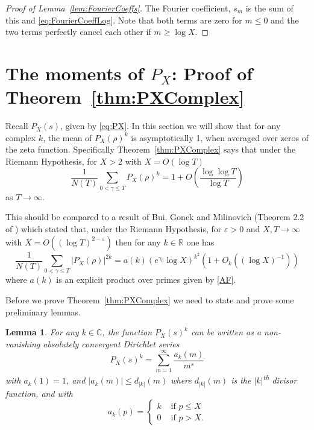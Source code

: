 \documentclass[12pt,a4paper,reqno]{amsart}
\newtheorem{lemma}[theorem]{Lemma}
\theoremstyle{remark}
\numberwithin{equation}{section}
\newcommand{\RR}{\mathbb{R}}
\newcommand{\CC}{\mathbb{C}}
\begin{document}
\begin{proof}[Proof of Lemma~\ref{lem:FourierCoeffs}]
The Fourier coefficient, $s_m$ is the sum of this and \eqref{eq:FourierCoeffLog}. Note that both terms are zero for $m\leq 0$ and the two terms perfectly cancel each other if $m\geq \log X$.
\end{proof}


\section{The moments of $P_X$: Proof of Theorem~\ref{thm:PXComplex}}\label{sect:PX}

Recall $P_X(s)$, given by \eqref{eq:PX}. In this section we will show that for any complex $k$, the mean of $P_X(\rho)^k$ is asymptotically 1, when averaged over zeros of the zeta function. Specifically Theorem~\ref{thm:PXComplex} says that under the Riemann Hypothesis, for $X>2$ with $X=O(\log T)$
\[
\frac{1}{N(T)} \sum_{0 < \gamma \leq T} P_X(\rho)^k = 1 + O\left(\frac{\log\log T}{\log T}\right)
\]
as $T\to\infty$.

This should be compared to a result of Bui, Gonek and Milinovich (Theorem 2.2 of \cite{BGM13}) which stated that, under the Riemann Hypothesis,
for $\varepsilon > 0$ and $X, T \to\infty$ with $X=O\left( (\log T)^{2-\varepsilon} \right)$ then for any $k\in\RR$ one has
\[
\frac{1}{N(T)} \sum_{0 < \gamma \leq T} \left\vert P_X(\rho)\right\vert^{2k} = a(k) \left(e^{\gamma_0} \log X\right)^{k^2} \left(1+O_k\left((\log X)^{-1} \right) \right)
\]
where $a(k)$ is an explicit product over primes given by \eqref{AF}.


Before we prove Theorem~\ref{thm:PXComplex} we need to state and prove some preliminary lemmas.

\begin{lemma}\label{lem:DirichletExpansionP_X}
For any $k \in \CC$, the function $P_X(s)^k$ can be written as a non-vanishing absolutely convergent Dirichlet series
\[
P_X(s)^k = \sum_{m=1}^\infty \frac{a_k(m)}{m^s}
\]
with $a_k(1)=1$, and $|a_k(m)| \leq d_{|k|}(m)$ where $d_{|k|}(m)$ is the $|k|$\textsuperscript{th} divisor function, and with 
\[
a_k(p)=
\begin{cases}
    k & \text{ if } p\leq X\\
    0 & \text{ if } p>X .
\end{cases}
\]
\end{lemma}
\end{document}
